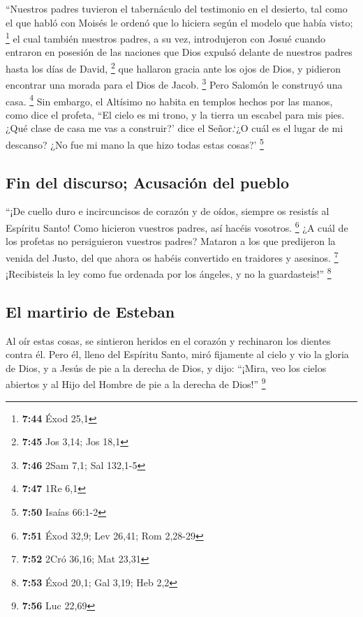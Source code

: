 \begin{paracol}{2}
 ``Nuestros padres tuvieron el tabernáculo del testimonio
en el desierto, tal como el que habló con Moisés le ordenó que lo
hiciera según el modelo que había visto; \footnote{\textbf{7:44} Éxod
  25,1}  el cual también nuestros padres, a su vez,
introdujeron con Josué cuando entraron en posesión de las naciones que
Dios expulsó delante de nuestros padres hasta los días de David,
\footnote{\textbf{7:45} Jos 3,14; Jos 18,1}  que hallaron
gracia ante los ojos de Dios, y pidieron encontrar una morada para el
Dios de Jacob. \footnote{\textbf{7:46} 2Sam 7,1; Sal 132,1-5}
 Pero Salomón le construyó una casa. \footnote{\textbf{7:47}
  1Re 6,1}  Sin embargo, el Altísimo no habita en templos
hechos por las manos, como dice el profeta,  ``El cielo
es mi trono, y la tierra un escabel para mis pies. ¿Qué clase de casa me
vas a construir?' dice el Señor.`¿O cuál es el lugar de mi descanso?
 ¿No fue mi mano la que hizo todas estas cosas?'
\footnote{\textbf{7:50} Isaías 66:1-2}

\hypertarget{fin-del-discurso-acusaciuxf3n-del-pueblo}{%
\subsection{Fin del discurso; Acusación del
pueblo}\label{fin-del-discurso-acusaciuxf3n-del-pueblo}}

 ``¡De cuello duro e incircuncisos de corazón y de oídos,
siempre os resistís al Espíritu Santo! Como hicieron vuestros padres,
así hacéis vosotros. \footnote{\textbf{7:51} Éxod 32,9; Lev 26,41; Rom
  2,28-29}  ¿A cuál de los profetas no persiguieron
vuestros padres? Mataron a los que predijeron la venida del Justo, del
que ahora os habéis convertido en traidores y asesinos. \footnote{\textbf{7:52}
  2Cró 36,16; Mat 23,31}  ¡Recibisteis la ley como fue
ordenada por los ángeles, y no la guardasteis!'' \footnote{\textbf{7:53}
  Éxod 20,1; Gal 3,19; Heb 2,2}

\hypertarget{el-martirio-de-esteban}{%
\subsection{El martirio de Esteban}\label{el-martirio-de-esteban}}

 Al oír estas cosas, se sintieron heridos en el corazón y
rechinaron los dientes contra él.  Pero él, lleno del
Espíritu Santo, miró fijamente al cielo y vio la gloria de Dios, y a
Jesús de pie a la derecha de Dios,  y dijo: ``¡Mira, veo
los cielos abiertos y al Hijo del Hombre de pie a la derecha de Dios!''
\footnote{\textbf{7:56} Luc 22,69}


\end{paracol}
